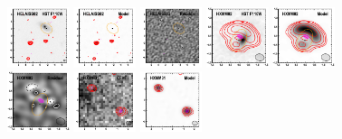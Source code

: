 \documentclass[iop]{emulateapj}
\begin{document}
\begin{figure}[!tbp] 
    \begin{centering}
\includegraphics[width=0.162\textwidth]{HELAISS02_optical_bestfit.pdf}
\includegraphics[width=0.162\textwidth]{HELAISS02_model_bestfit.pdf}
\includegraphics[width=0.162\textwidth]{HELAISS02_residual_bestfit.pdf}
\includegraphics[width=0.162\textwidth]{HXMM02_optical_bestfit.pdf}
\includegraphics[width=0.162\textwidth]{HXMM02_model_bestfit.pdf}
\includegraphics[width=0.162\textwidth]{HXMM02_residual_bestfit.pdf}
\includegraphics[width=0.162\textwidth]{HXMM31_optical_bestfit.pdf}
\includegraphics[width=0.162\textwidth]{HXMM31_model_bestfit.pdf}

\end{centering}
\end{figure}
\end{document}
